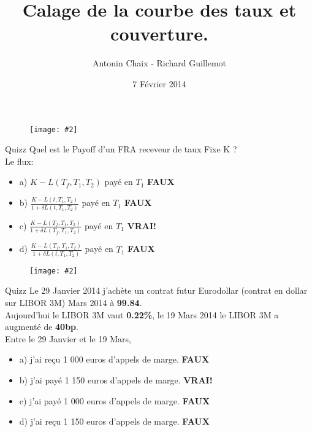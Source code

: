 \documentclass{beamer}
\title[Produits dérivés de taux]{Calage de la courbe des taux et couverture.}
\author{Antonin Chaix - Richard Guillemot}
\institute{Master IFMA}
\date{7 Février 2014}
\newcommand{\FIG}[2]{\texttt{[image: \#2]}}
\begin{document}
\begin{frame}
\titlepage
\begin{figure}[h]
\centering \FIG{5cm}{figures/UPMC_IFMA.jpg}
\end{figure}

\end{frame}

\begin{frame}{Quizz}
Quel est le Payoff d'un FRA receveur de taux Fixe K ?\\
\vspace{0.5cm}
Le flux:
\begin{itemize}
\item a) $K - L(T_f,T_{1},T_{2})$ payé en $T_1$ \textbf{\color{red}FAUX}
\item b) $\frac{K - L(t,T_{1},T_{2})}{1+\delta  L(t,T_{1},T_{2})}$ payé en $T_1$ \textbf{\color{red}FAUX}
\item c) $\frac{K - L(T_f,T_{1},T_{2})}{1+\delta  L(T_f,T_{1},T_{2})}$ payé en $T_1$ \textbf{\color{green}VRAI!}
\item d) $\frac{K - L(T_f,T_{1},T_{2})}{1+\delta  L(t,T_{1},T_{2})}$ payé en $T_1$ \textbf{\color{red}FAUX}
\end{itemize}
\begin{figure}[h]
\FIG{10cm}{figures/schema_fra.jpg}
\end{figure}

\end{frame}

\begin{frame}{Quizz}
Le 29 Janvier 2014 j'achète un contrat futur Eurodollar (contrat en dollar sur LIBOR 3M) Mars 2014 à \textbf{99.84}.\\
Aujourd'hui le LIBOR 3M vaut \textbf{0.22\%}, le 19 Mars 2014 le LIBOR 3M a augmenté de \textbf{40bp}.\\
\vspace{0.5cm}
Entre le 29 Janvier et le 19 Mars,\\
\begin{itemize}
\item a) j'ai reçu 1 000 euros d'appels de marge. \textbf{\color{red}FAUX}
\item b) j'ai payé 1 150 euros d'appels de marge. \textbf{\color{green}VRAI!}
\item c) j'ai payé 1 000 euros d'appels de marge. \textbf{\color{red}FAUX}
\item d) j'ai reçu 1 150 euros d'appels de marge. \textbf{\color{red}FAUX}

\end{itemize}
\end{frame}
\end{document}
